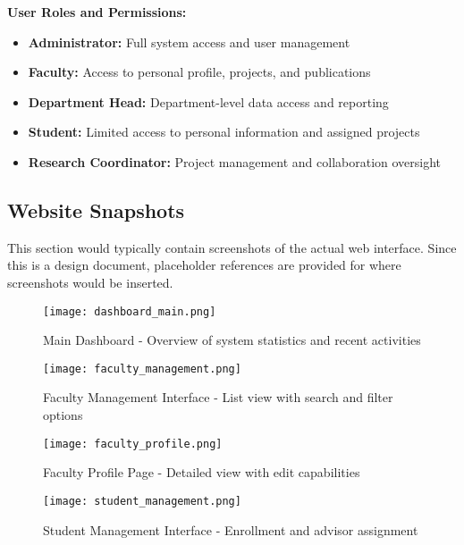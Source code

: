 \documentclass[12pt,a4paper]{article}
\begin{document}
\textbf{User Roles and Permissions:}
\begin{itemize}
    \item \textbf{Administrator:} Full system access and user management
    \item \textbf{Faculty:} Access to personal profile, projects, and publications
    \item \textbf{Department Head:} Department-level data access and reporting
    \item \textbf{Student:} Limited access to personal information and assigned projects
    \item \textbf{Research Coordinator:} Project management and collaboration oversight
\end{itemize}

\subsection{Website Snapshots}
This section would typically contain screenshots of the actual web interface. Since this is a design document, placeholder references are provided for where screenshots would be inserted.

\begin{figure}[H]
    \centering
    \texttt{[image: dashboard\_main.png]}
    \caption{Main Dashboard - Overview of system statistics and recent activities}
    \label{fig:dashboard}
\end{figure}

\begin{figure}[H]
    \centering
    \texttt{[image: faculty\_management.png]}
    \caption{Faculty Management Interface - List view with search and filter options}
    \label{fig:faculty_mgmt}
\end{figure}

\begin{figure}[H]
    \centering
    \texttt{[image: faculty\_profile.png]}
    \caption{Faculty Profile Page - Detailed view with edit capabilities}
    \label{fig:faculty_profile}
\end{figure}

\begin{figure}[H]
    \centering
    \texttt{[image: student\_management.png]}
    \caption{Student Management Interface - Enrollment and advisor assignment}
    \label{fig:student_mgmt}
\end{figure}
\end{document}
